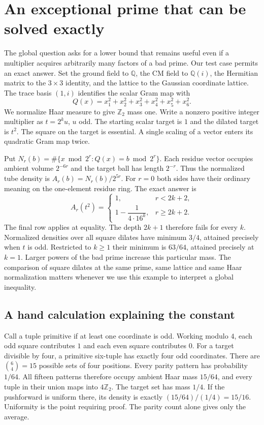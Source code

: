 \documentclass[12pt,letterpaper]{article}
\begin{document}
\section{An exceptional prime that can be solved exactly}
\label{sec:dyadicwave}
The global question asks for a lower bound that remains useful even if a multiplier acquires arbitrarily many factors of a bad prime. Our test case permits an exact answer. Set the ground field to $\mathbb Q$, the CM field to $\mathbb Q(i)$, the Hermitian matrix to the $3\times3$ identity, and the lattice to the Gaussian coordinate lattice. The trace basis $(1,i)$ identifies the scalar Gram map with
\[
 Q(x)=x_1^2+x_2^2+x_3^2+x_4^2+x_5^2+x_6^2.
\]
We normalize Haar measure to give $\mathbb Z_2$ mass one. Write a nonzero positive integer multiplier as $t=2^k u$, $u$ odd. The starting scalar target is $1$ and the dilated target is $t^2$. The square on the target is essential. A single scaling of a vector enters its quadratic Gram map twice.

Put $N_r(b)=\#\{x\bmod 2^r:Q(x)=b\bmod 2^r\}$. Each residue vector occupies ambient volume $2^{-6r}$ and the target ball has length $2^{-r}$. Thus the normalized tube density is $A_r(b)=N_r(b)/2^{5r}$. For $r=0$ both sides have their ordinary meaning on the one-element residue ring. The exact answer is
\[
 A_r(t^2)=
 \begin{cases}
 1,&r<2k+2,\\[2pt]
 1-\dfrac{1}{4\cdot16^k},&r\ge 2k+2 .
 \end{cases}
\]
The final row applies at equality. The depth $2k+1$ therefore fails for every $k$. Normalized densities over all square dilates have minimum $3/4$, attained precisely when $t$ is odd. Restricted to $k\ge1$ their minimum is $63/64$, attained precisely at $k=1$. Larger powers of the bad prime increase this particular mass. The comparison of square dilates at the same prime, same lattice and same Haar normalization matters whenever we use this example to interpret a global inequality.

\subsection{A hand calculation explaining the constant}
Call a tuple primitive if at least one coordinate is odd. Working modulo $4$, each odd square contributes $1$ and each even square contributes $0$. For a target divisible by four, a primitive six-tuple has exactly four odd coordinates. There are $\binom64=15$ possible sets of four positions. Every parity pattern has probability $1/64$. All fifteen patterns therefore occupy ambient Haar mass $15/64$, and every tuple in their union maps into $4\mathbb Z_2$. The target set has mass $1/4$. If the pushforward is uniform there, its density is exactly $(15/64)/(1/4)=15/16$. Uniformity is the point requiring proof. The parity count alone gives only the average.
\end{document}
